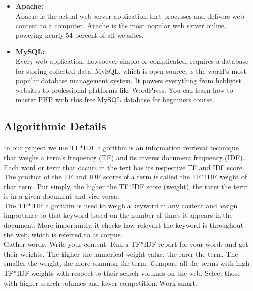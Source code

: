 \begin{itemize}
	\item \textbf{Apache:}\\ Apache is the actual web server application that processes and delivers web content to a computer. Apache is the most popular web server online, powering nearly 54 percent of all websites.\\
	
	\item \textbf{MySQL:}\\ Every web application, howsoever simple or complicated, requires a database for storing collected data. MySQL, which is open source, is the world’s most popular database management system. It powers everything from hobbyist websites to professional platforms like WordPress. You can learn how to master PHP with this free MySQL database for beginners course.\\
\end{itemize}

\subsection{Algorithmic Details}
\paragraph{}In our project we use TF*IDF algorithm is an information retrieval technique that weighs a term’s frequency (TF) and its inverse document frequency (IDF). Each word or term that occurs in the text has its respective TF and IDF score.\\
The product of the TF and IDF scores of a term is called the TF*IDF weight of that term. Put simply, the higher the TF*IDF score (weight), the rarer the term is in a given document and vice versa.\\
The TF*IDF algorithm is used to weigh a keyword in any content and assign importance to that keyword based on the number of times it appears in the document. More importantly, it checks how relevant the keyword is throughout the web, which is referred to as corpus.\\

Gather words. Write your content. Run a TF*IDF report for your words and get their weights. The higher the numerical weight value, the rarer the term. The smaller the weight, the more common the term. Compare all the terms with high TF*IDF weights with respect to their search volumes on the web. Select those with higher search volumes and lower competition. Work smart.\\

